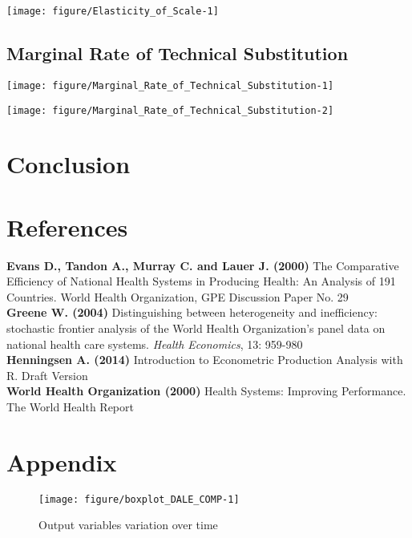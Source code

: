 \documentclass[12pt,a4paper]{article}\usepackage[]{graphicx}\usepackage[]{color}
\makeatletter
\def\maxwidth{ %
  \ifdim\Gin@nat@width>\linewidth
    \linewidth
  \else
    \Gin@nat@width
  \fi
}
\newenvironment{knitrout}{}{} %
\makeatother
\begin{document}
\texttt{[image: figure/Elasticity\_of\_Scale-1]} 

\subsection{Marginal Rate of Technical Substitution}


\texttt{[image: figure/Marginal\_Rate\_of\_Technical\_Substitution-1]} 

\texttt{[image: figure/Marginal\_Rate\_of\_Technical\_Substitution-2]} 



\section{Conclusion}



\newpage
\section{References}
\textbf{Evans D., Tandon A., Murray C. and Lauer J. (2000)} The Comparative Efficiency of National Health Systems in Producing Health: An Analysis of 191 Countries. World Health Organization, GPE Discussion Paper No. 29 \\

\textbf{Greene W. (2004)} Distinguishing between heterogeneity and inefficiency: stochastic frontier analysis of the World Health Organization's panel data on national health care systems. \textit{Health Economics}, 13: 959-980 \\

\textbf{Henningsen A. (2014)} Introduction to Econometric Production Analysis with R. Draft Version \\

\textbf{World Health Organization (2000)} Health Systems: Improving Performance. The World Health Report



\newpage
\section{Appendix}


\begin{knitrout}
\color{fgcolor}\begin{figure}[htbp]

{\centering \texttt{[image: figure/boxplot\_DALE\_COMP-1]} 

}

\caption[Output variables variation over time]{Output variables variation over time}\label{fig:boxplot_DALE_COMP}
\end{figure}


\end{knitrout}










\end{document}
